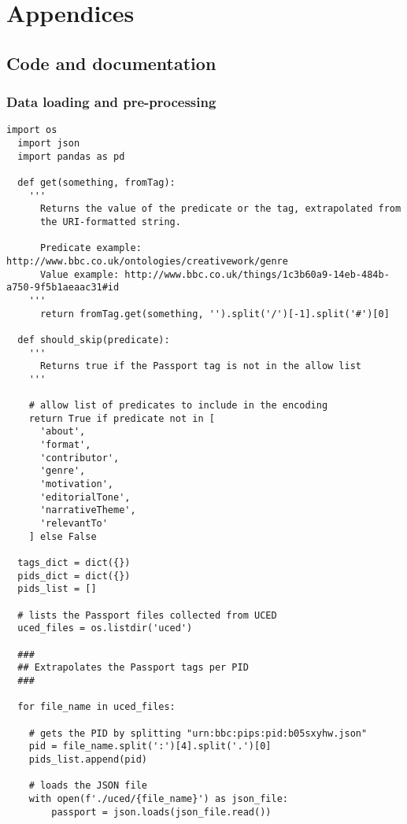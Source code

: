 \section{Appendices}

\subsection{Code and documentation}

\subsubsection{Data loading and pre-processing}

\begin{lstlisting}[caption={Passport tags loading},label={lst:data_loading}]
  import os
  import json
  import pandas as pd

  def get(something, fromTag):
    '''
      Returns the value of the predicate or the tag, extrapolated from
      the URI-formatted string.

      Predicate example: http://www.bbc.co.uk/ontologies/creativework/genre
      Value example: http://www.bbc.co.uk/things/1c3b60a9-14eb-484b-a750-9f5b1aeaac31#id
    '''
      return fromTag.get(something, '').split('/')[-1].split('#')[0]

  def should_skip(predicate):
    '''
      Returns true if the Passport tag is not in the allow list
    '''

    # allow list of predicates to include in the encoding
    return True if predicate not in [
      'about',
      'format',
      'contributor',
      'genre',
      'motivation',
      'editorialTone',
      'narrativeTheme',
      'relevantTo'
    ] else False

  tags_dict = dict({})
  pids_dict = dict({})
  pids_list = []

  # lists the Passport files collected from UCED
  uced_files = os.listdir('uced')

  ###
  ## Extrapolates the Passport tags per PID
  ###

  for file_name in uced_files:

    # gets the PID by splitting "urn:bbc:pips:pid:b05sxyhw.json"
    pid = file_name.split(':')[4].split('.')[0]
    pids_list.append(pid)

    # loads the JSON file
    with open(f'./uced/{file_name}') as json_file:
        passport = json.loads(json_file.read())


\end{lstlisting}
